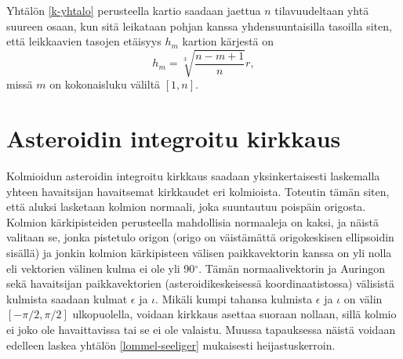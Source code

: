 \documentclass[12pt,a4paper,titlepage]{article}
\begin{document}
Yhtälön \ref{k-yhtalo} perusteella kartio saadaan jaettua $n$ tilavuudeltaan yhtä suureen osaan, kun sitä leikataan pohjan kanssa yhdensuuntaisilla tasoilla siten, että leikkaavien tasojen etäisyys $h_m$ kartion kärjestä on
\begin{equation}
	h_m=\sqrt[3]{\frac{n-m+1}{n}}r,
\end{equation}
missä $m$ on kokonaisluku väliltä $[1, n]$.


	
\section{Asteroidin integroitu kirkkaus}
Kolmioidun asteroidin integroitu kirkkaus saadaan yksinkertaisesti laskemalla yhteen havaitsijan havaitsemat kirkkaudet eri kolmioista. Toteutin tämän siten, että aluksi lasketaan kolmion normaali, joka suuntautuu poispäin origosta. Kolmion kärkipisteiden perusteella mahdollisia normaaleja on kaksi, ja näistä valitaan se, jonka pistetulo origon (origo on väistämättä origokeskisen ellipsoidin sisällä) ja jonkin kolmion kärkipisteen välisen paikkavektorin kanssa on yli nolla eli vektorien välinen kulma ei ole yli 90$^\circ$. Tämän normaalivektorin ja Auringon sekä havaitsijan paikkavektorien (asteroidikeskeisessä koordinaatistossa) välisistä kulmista saadaan kulmat $\epsilon$ ja $\iota$. Mikäli kumpi tahansa kulmista $\epsilon$ ja $\iota$ on välin $[-\pi/2, \pi/2]$ ulkopuolella, voidaan kirkkaus asettaa suoraan nollaan, sillä kolmio ei joko ole havaittavissa tai se ei ole valaistu. Muussa tapauksessa näistä voidaan edelleen laskea yhtälön \ref{lommel-seeliger} mukaisesti heijastuskerroin.
\end{document}

